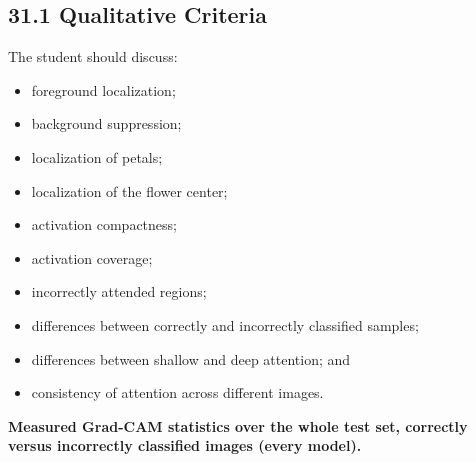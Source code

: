 \documentclass[10pt]{article}
\begin{document}
\subsection*{31.1 Qualitative Criteria}

The student should discuss:

\begin{itemize}

\item foreground localization;

\item background suppression;

\item localization of petals;

\item localization of the flower center;

\item activation compactness;

\item activation coverage;

\item incorrectly attended regions;

\item differences between correctly and incorrectly classified samples;

\item differences between shallow and deep attention; and

\item consistency of attention across different images.

\end{itemize}


\textbf{Measured Grad-CAM statistics over the whole test set, correctly versus incorrectly classified images (every model).}
\end{document}
